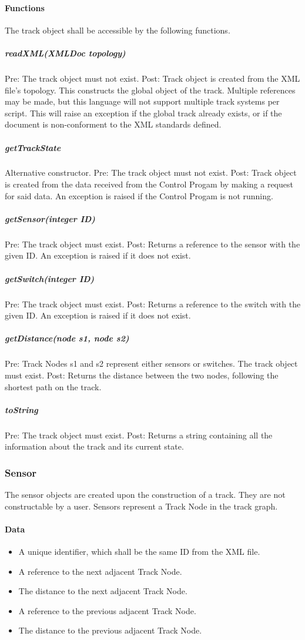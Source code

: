 \documentclass[a4paper,11pt,notitlepage]{article}
\def\CS{Control Progam\xspace} \def\LC{Local Copy of Train State\xspace} \def\TN{Track Node\xspace}
\begin{document}
\paragraph{Functions}
The track object shall be accessible by the following functions.
\subparagraph{readXML(XMLDoc topology)} Pre: The track object must not exist. Post: Track object is created from the XML file's topology. This constructs the global object of the track. Multiple references may be made, but this language will not support multiple track systems per script. This will raise an exception if the global track already exists, or if the document is non-conforment to the XML standards defined.
\subparagraph{getTrackState} Alternative constructor. Pre: The track object must not exist. Post: Track object is created from the data received from the \CS by making a request for said data. An exception is raised if the \CS is not running.
\subparagraph{getSensor(integer ID)} Pre: The track object must exist. Post: Returns a reference to the sensor with the given ID. An exception is raised if it does not exist.
\subparagraph{getSwitch(integer ID)} Pre: The track object must exist. Post: Returns a reference to the switch with the given ID. An exception is raised if it does not exist.
\subparagraph{getDistance(node s1, node s2)} Pre: \TN{}s s1 and s2 represent either sensors or switches. The track object must exist. Post: Returns the distance between the two nodes, following the shortest path on the track.
\subparagraph{toString} Pre: The track object must exist. Post: Returns a string containing all the information about the track and its current state.

\subsubsection{Sensor}
The sensor objects are created upon the construction of a track. They are not constructable by a user. Sensors represent a \TN in the track graph.
\paragraph{Data}
\begin{itemize}
\item A unique identifier, which shall be the same ID from the XML file.
\item A reference to the next adjacent \TN.
\item The distance to the next adjacent \TN.
\item A reference to the previous adjacent \TN.
\item The distance to the previous adjacent \TN.
\end{itemize}
\end{document}
